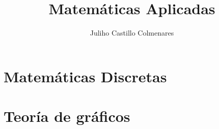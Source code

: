 \documentclass[
]{amsbook}
\title{Matemáticas Aplicadas}
\author[J. Castillo]{Juliho Castillo Colmenares}
\begin{document}
	\maketitle
	\tableofcontents

\chapter{Matemáticas Discretas}





\chapter{Teoría de gráficos}




	
%
\end{document}
